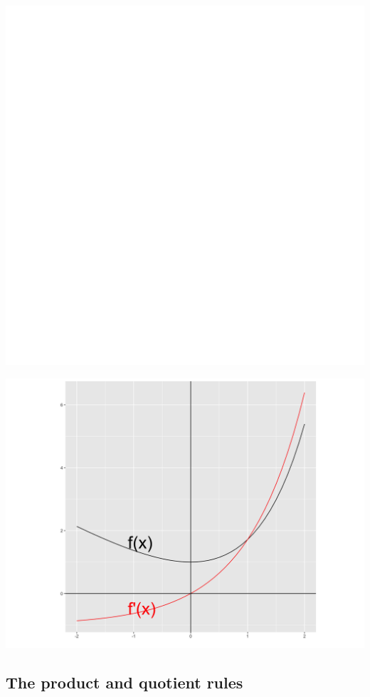 \documentclass[]{book}
\begin{document}
\begin{center}\includegraphics[width=1\linewidth]{figure/LB15-1} \end{center}

\begin{center}\includegraphics[width=0.8\linewidth]{figure/LB16-1} \end{center}

\hypertarget{the-product-and-quotient-rules}{%
\subsection{The product and quotient rules}\label{the-product-and-quotient-rules}}
\end{document}
